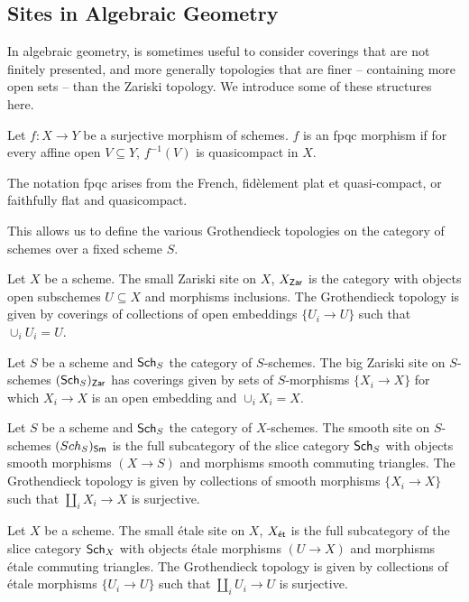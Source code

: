 \subsection{Sites in Algebraic Geometry}\label{subsec: sites in algebraic geometry}
In algebraic geometry, is sometimes useful to consider coverings that are not finitely presented, and more generally topologies that are finer -- containing more open sets -- than the Zariski topology. We introduce some of these structures here. 
\begin{definition}\label{def: fpqc morphism}
    Let $f:X\to Y$ be a surjective morphism of schemes. $f$ is an fpqc morphism if for every affine open $V\subseteq Y$, $f^{-1}(V)$ is quasicompact in $X$.
\end{definition}
\begin{remark}
    The notation fpqc arises from the French, fid\`{e}lement plat et quasi-compact, or faithfully flat and quasicompact. 
\end{remark}
This allows us to define the various Grothendieck topologies on the category of schemes over a fixed scheme $S$. 
\begin{definition}\label{def: small Zariski site}
    Let $X$ be a scheme. The small Zariski site on $X$, $X_{\mathsf{Zar}}$ is the category with objects open subschemes $U\subseteq X$ and morphisms inclusions. The Grothendieck topology is given by coverings of collections of open embeddings $\{U_{i}\to U\}$ such that $\cup_{i}U_{i}=U$. 
\end{definition}
\begin{definition}\label{def: big Zariski site}
    Let $S$ be a scheme and $\mathsf{Sch}_{S}$ the category of $S$-schemes. The big Zariski site on $S$-schemes $(\mathsf{Sch}_{S})_{\mathsf{Zar}}$ has coverings given by sets of $S$-morphisms $\{X_{i}\to X\}$ for which $X_{i}\to X$ is an open embedding and $\cup_{i}X_{i}=X$. 
\end{definition}
\begin{definition}\label{def: smooth site}
    Let $S$ be a scheme and $\mathsf{Sch}_{S}$ the category of $X$-schemes. The smooth site on $S$-schemes $(Sch_{S})_{\mathsf{Sm}}$ is the full subcategory of the slice category $\mathsf{Sch}_{S}$ with objects smooth morphisms $(X\to S)$ and morphisms smooth commuting triangles. The Grothendieck topology is given by collections of smooth morphisms $\{X_{i}\to X\}$ such that $\coprod_{i}X_{i}\to X$ is surjective. 
\end{definition}
\begin{definition}\label{def: small etale site}
    Let $X$ be a scheme. The small \'{e}tale site on $X$, $X_{\mathsf{\acute{e}t}}$ is the full subcategory of the slice category $\mathsf{Sch}_{X}$ with objects \'{e}tale morphisms $(U\to X)$ and morphisms \'{e}tale commuting triangles. The Grothendieck topology is given by collections of \'{e}tale morphisms $\{U_{i}\to U\}$ such that $\coprod_{i}U_{i}\to U$ is surjective. 
\end{definition}
